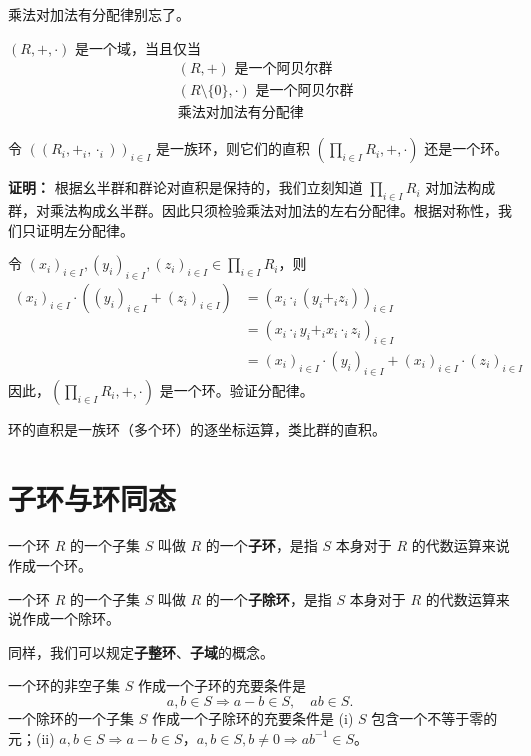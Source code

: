 \begin{note}[定义2 5域：交换的除环]
乘法对加法有分配律别忘了。
\end{note}

\begin{proposition}[命题 2.3：域的等价条件]
$(R,+,\cdot)$ 是一个域，当且仅当
\begin{align}
&(R,+)\text{ 是一个阿贝尔群}\\
&(R\setminus\{0\},\cdot)\text{ 是一个阿贝尔群}\\
&\text{乘法对加法有分配律}
\end{align}
\end{proposition}

\begin{proposition}[命题 2.5：环的直积还是环]
令 $((R_i,+_i,\cdot_i))_{i\in I}$ 是一族环，则它们的直积 $(\prod_{i\in I}R_i,+,\cdot)$ 还是一个环。

\textbf{证明：} 根据幺半群和群论对直积是保持的，我们立刻知道 $\prod_{i\in I}R_i$ 对加法构成群，对乘法构成幺半群。因此只须检验乘法对加法的左右分配律。根据对称性，我们只证明左分配律。

令 $(x_i)_{i\in I},(y_i)_{i\in I},(z_i)_{i\in I}\in\prod_{i\in I}R_i$，则
\begin{align}
(x_i)_{i\in I}\cdot((y_i)_{i\in I}+(z_i)_{i\in I})
&=(x_i\cdot_i(y_i+_i z_i))_{i\in I}\\
&=(x_i\cdot_i y_i+_i x_i\cdot_i z_i)_{i\in I}\\
&=(x_i)_{i\in I}\cdot(y_i)_{i\in I}+(x_i)_{i\in I}\cdot(z_i)_{i\in I}
\end{align}
因此，$(\prod_{i\in I}R_i,+,\cdot)$ 是一个环。验证分配律。
\end{proposition}

\begin{note}[定义2 8环的直积]
环的直积是一族环（多个环）的逐坐标运算，类比群的直积。
\end{note}

\section{子环与环同态}

\begin{definition}[子环与子除环]
一个环 $R$ 的一个子集 $S$ 叫做 $R$ 的一个\textbf{子环}，是指 $S$ 本身对于 $R$ 的代数运算来说作成一个环。

一个环 $R$ 的一个子集 $S$ 叫做 $R$ 的一个\textbf{子除环}，是指 $S$ 本身对于 $R$ 的代数运算来说作成一个除环。

同样，我们可以规定\textbf{子整环}、\textbf{子域}的概念。

一个环的非空子集 $S$ 作成一个子环的充要条件是
\[
a,b\in S\Rightarrow a-b\in S,\quad ab\in S.
\]
一个除环的一个子集 $S$ 作成一个子除环的充要条件是 (i) $S$ 包含一个不等于零的元；(ii) $a,b\in S\Rightarrow a-b\in S$，$a,b\in S,b\ne 0\Rightarrow ab^{-1}\in S$。
\end{definition}

